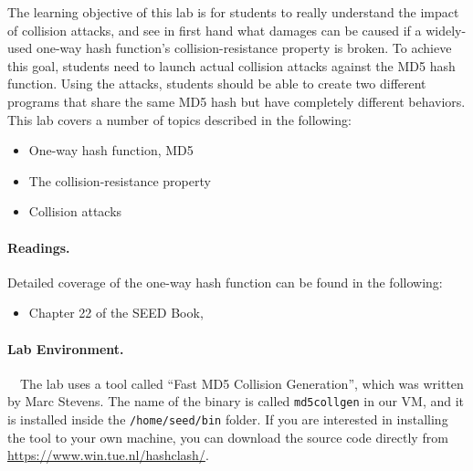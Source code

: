 The learning objective of this lab is for students to really
understand the impact of collision attacks, and see in first hand what
damages can be caused if a widely-used one-way hash function's
collision-resistance property is broken. To achieve this goal, students
need to launch actual collision attacks against the MD5 hash function.
Using the attacks, students should be able to create two different programs
that share the same MD5 hash but have completely different behaviors.
This lab covers a number of topics described in the following:

\begin{itemize}[noitemsep]
\item One-way hash function, MD5
\item The collision-resistance property
\item Collision attacks
\end{itemize}


\paragraph{Readings.}
Detailed coverage of the one-way hash function can be found in the following:

\begin{itemize}
\item Chapter 22 of the SEED Book, \seedbook
\end{itemize}



\paragraph{Lab Environment.} \seedenvironmentB \ \ 
The lab uses a tool 
called ``Fast MD5 Collision Generation'', which was written by Marc Stevens. 
The name of the binary is called \texttt{md5collgen} in our VM, and it is 
installed inside the \texttt{/home/seed/bin} folder.
If you are interested in installing the tool to your own machine, you
can download the source code directly from
\url{https://www.win.tue.nl/hashclash/}.



